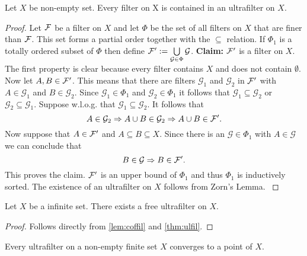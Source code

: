 \begin{thm}\label{thm:ulfil}
  Let $X$ be non-empty set. Every filter on X is contained in an ultrafilter on $X$.
\end{thm}

\begin{proof}
  Let $\mathcal{F}$ be a filter on $X$ and let $\Phi$ be the set of all filters on $X$ that are finer than $\mathcal{F}$. This set forms a partial order together with the $\subseteq$ relation.
  If $\Phi_1$ is a totally ordered subset of $\Phi$ then define $\mathcal{F}' := \bigcup\limits_{\mathcal{G} \in \Phi} \mathcal{G}$.
  \textbf{Claim: } $\mathcal{F}'$ is a filter on $X$. The first property is clear because every filter contains $X$ and does not contain $\emptyset$.
  Now let $A, B \in \mathcal{F}'$. This means that there are filters $\mathcal{G}_1$ and $\mathcal{G}_2$ in $\mathcal{F}'$ with $A \in \mathcal{G}_1$ and $B \in \mathcal{G}_2$.
  Since $\mathcal{G}_1 \in \Phi_1$ and $\mathcal{G}_2 \in \Phi_1$ it follows that $\mathcal{G}_1 \subseteq \mathcal{G}_2$ or $\mathcal{G}_2 \subseteq \mathcal{G}_1$. Suppose w.l.o.g. that $\mathcal{G}_1 \subseteq \mathcal{G}_2$.
  It follows that
  \begin{equation*}
    A \in \mathcal{G}_2 \Rightarrow A \cup B \in \mathcal{G}_2 \Rightarrow A \cup B \in \mathcal{F}'.
  \end{equation*}
  Now suppose that $A \in \mathcal{F}'$ and $A \subseteq B \subseteq X$. Since there is an $\mathcal{G} \in \Phi_1$ with $A \in \mathcal{G}$ we can conclude that
  \begin{equation*}
    B \in \mathcal{G} \Rightarrow B \in \mathcal{F}'.
  \end{equation*}
  This proves the claim. $\mathcal{F}'$ is an upper bound of $\Phi_1$ and thus $\Phi_1$ is inductively sorted. The existence of an ultrafilter on $X$ follows from Zorn's Lemma. \cite[5.12 Satz]{BvQMT}
\end{proof}

\begin{col}\label{col:exfreeuf}
  Let $X$ be a infinite set. There exists a free ultrafilter on $X$.
\end{col}

\begin{proof}
  Follows directly from \ref{lem:coffil} and \ref{thm:ulfil}.
\end{proof}

\begin{lemma}
  Every ultrafilter on a non-empty finite set $X$ converges to a point of $X$.
\end{lemma}

